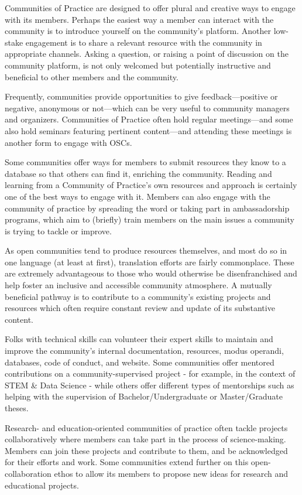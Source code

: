 \documentclass[
  letterpaper,
  DIV=11,
  numbers=noendperiod]{scrreport}
\begin{document}
Communities of Practice are designed to offer plural and creative ways
to engage with its members. Perhaps the easiest way a member can
interact with the community is to introduce yourself on the community's
platform. Another low-stake engagement is to share a relevant resource
with the community in appropriate channels. Asking a question, or
raising a point of discussion on the community platform, is not only
welcomed but potentially instructive and beneficial to other members and
the community.

Frequently, communities provide opportunities to give
feedback---positive or negative, anonymous or not---which can be very
useful to community managers and organizers. Communities of Practice
often hold regular meetings---and some also hold seminars featuring
pertinent content---and attending these meetings is another form to
engage with OSCs.

Some communities offer ways for members to submit resources they know to
a database so that others can find it, enriching the community. Reading
and learning from a Community of Practice's own resources and approach
is certainly one of the best ways to engage with it. Members can also
engage with the community of practice by spreading the word or taking
part in ambassadorship programs, which aim to (briefly) train members on
the main issues a community is trying to tackle or improve.

As open communities tend to produce resources themselves, and most do so
in one language (at least at first), translation efforts are fairly
commonplace. These are extremely advantageous to those who would
otherwise be disenfranchised and help foster an inclusive and accessible
community atmosphere. A mutually beneficial pathway is to contribute to
a community's existing projects and resources which often require
constant review and update of its substantive content.

Folks with technical skills can volunteer their expert skills to
maintain and improve the community's internal documentation, resources,
modus operandi, databases, code of conduct, and website. Some
communities offer mentored contributions on a community-supervised
project - for example, in the context of STEM \& Data Science - while
others offer different types of mentorships such as helping with the
supervision of Bachelor/Undergraduate or Master/Graduate theses.

Research- and education-oriented communities of practice often tackle
projects collaboratively where members can take part in the process of
science-making. Members can join these projects and contribute to them,
and be acknowledged for their efforts and work. Some communities extend
further on this open-collaboration ethos to allow its members to propose
new ideas for research and educational projects.
\end{document}
